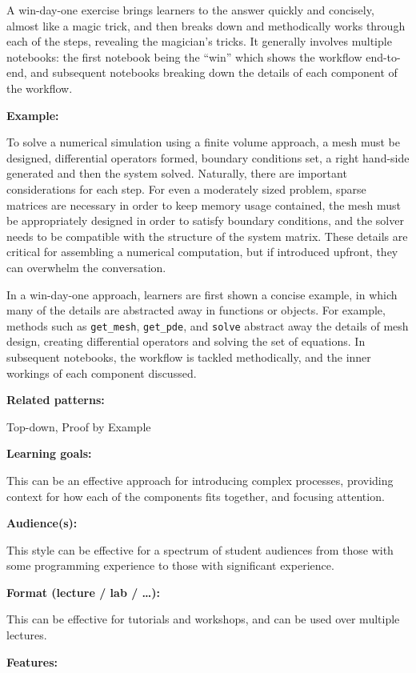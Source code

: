 \documentclass[]{book}
\begin{document}
A win-day-one exercise brings learners to the answer quickly and
concisely, almost like a magic trick, and then breaks down and
methodically works through each of the steps, revealing the magician's
tricks. It generally involves multiple notebooks: the first notebook
being the ``win'' which shows the workflow end-to-end, and subsequent
notebooks breaking down the details of each component of the workflow.

\textbf{Example:}

To solve a numerical simulation using a finite volume approach, a mesh
must be designed, differential operators formed, boundary conditions
set, a right hand-side generated and then the system solved. Naturally,
there are important considerations for each step. For even a moderately
sized problem, sparse matrices are necessary in order to keep memory
usage contained, the mesh must be appropriately designed in order to
satisfy boundary conditions, and the solver needs to be compatible with
the structure of the system matrix. These details are critical for
assembling a numerical computation, but if introduced upfront, they can
overwhelm the conversation.

In a win-day-one approach, learners are first shown a concise example,
in which many of the details are abstracted away in functions or
objects. For example, methods such as \texttt{get\_mesh},
\texttt{get\_pde}, and \texttt{solve} abstract away the details of mesh
design, creating differential operators and solving the set of
equations. In subsequent notebooks, the workflow is tackled
methodically, and the inner workings of each component discussed.

\textbf{Related patterns:}

Top-down, Proof by Example

\textbf{Learning goals:}

This can be an effective approach for introducing complex processes,
providing context for how each of the components fits together, and
focusing attention.

\textbf{Audience(s):}

This style can be effective for a spectrum of student audiences from
those with some programming experience to those with significant
experience.

\textbf{Format (lecture / lab / \ldots{}):}

This can be effective for tutorials and workshops, and can be used over
multiple lectures.

\textbf{Features:}
\end{document}
